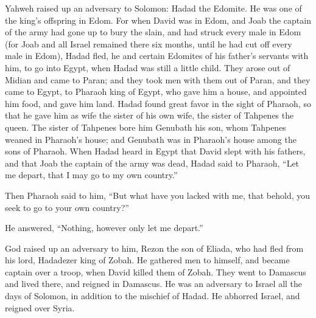  Yahweh raised up an adversary to Solomon: Hadad the
Edomite. He was one of the king's offspring in Edom.  For
when David was in Edom, and Joab the captain of the army had gone up to
bury the slain, and had struck every male in Edom  (for
Joab and all Israel remained there six months, until he had cut off
every male in Edom),  Hadad fled, he and certain Edomites
of his father's servants with him, to go into Egypt, when Hadad was
still a little child.  They arose out of Midian and came
to Paran; and they took men with them out of Paran, and they came to
Egypt, to Pharaoh king of Egypt, who gave him a house, and appointed him
food, and gave him land.  Hadad found great favor in the
sight of Pharaoh, so that he gave him as wife the sister of his own
wife, the sister of Tahpenes the queen.  The sister of
Tahpenes bore him Genubath his son, whom Tahpenes weaned in Pharaoh's
house; and Genubath was in Pharaoh's house among the sons of Pharaoh.
 When Hadad heard in Egypt that David slept with his
fathers, and that Joab the captain of the army was dead, Hadad said to
Pharaoh, ``Let me depart, that I may go to my own country.''

 Then Pharaoh said to him, ``But what have you lacked
with me, that behold, you seek to go to your own country?''

He answered, ``Nothing, however only let me depart.''

 God raised up an adversary to him, Rezon the son of
Eliada, who had fled from his lord, Hadadezer king of Zobah.
 He gathered men to himself, and became captain over a
troop, when David killed them of Zobah. They went to Damascus and lived
there, and reigned in Damascus.  He was an adversary to
Israel all the days of Solomon, in addition to the mischief of Hadad. He
abhorred Israel, and reigned over Syria.

